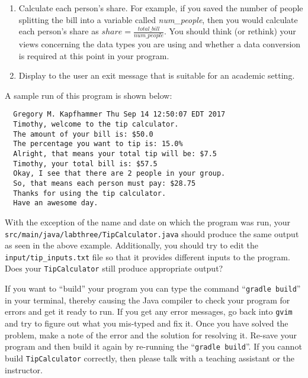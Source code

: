 \documentclass[11pt]{article}
\newcommand{\mainprogram}{\lstinline{TipCalculator}}
\newcommand{\mainprogramsource}{\lstinline{src/main/java/labthree/TipCalculator.java}}
\newcommand{\mainprograminput}{\lstinline{input/tip_inputs.txt}}
\newcommand{\gradlebuild}{\command{gradle build}}
\newcommand{\command}[1]{``\lstinline{#1}''}
\newcommand{\program}[1]{\lstinline{#1}}
\newcommand{\option}[1]{``{#1}''}
\newcommand{\step}[1]{``{#1}''}
\begin{document}
\begin{enumerate}
  \item Calculate each person's share. For example, if you saved the number of people splitting the bill into a variable
    called {\em num\_people}, then you would calculate each person's share as $share = \frac{total\_bill}{num\_people}$. You should think (or rethink) your views concerning the data types you are using and whether a data
    conversion is required at this point in your program.

  \item Display to the user an exit message that is suitable for an academic setting.

\end{enumerate}

\noindent
A sample run of this program is shown below:

\begin{verbatim}
  Gregory M. Kapfhammer Thu Sep 14 12:50:07 EDT 2017
  Timothy, welcome to the tip calculator.
  The amount of your bill is: $50.0
  The percentage you want to tip is: 15.0%
  Alright, that means your total tip will be: $7.5
  Timothy, your total bill is: $57.5
  Okay, I see that there are 2 people in your group.
  So, that means each person must pay: $28.75
  Thanks for using the tip calculator.
  Have an awesome day.
\end{verbatim}

With the exception of the name and date on which the program was run, your \mainprogramsource{} should produce the same
output as seen in the above example. Additionally, you should try to edit the \mainprograminput{} file so that it
provides different inputs to the program. Does your \mainprogram{} still produce appropriate output?


If you want to \step{build} your program you can type the command \gradlebuild{} in your terminal, thereby causing the
Java compiler to check your program for errors and get it ready to run. If you get any error messages, go back into
\program{gvim} and try to figure out what you mis-typed and fix it. Once you have solved the problem, make a note of the
error and the solution for resolving it. Re-save your program and then build it again by re-running the \gradlebuild{}.
If you cannot build \mainprogram{} correctly, then please talk with a teaching assistant or the instructor.
\end{document}

